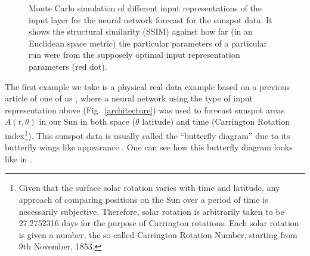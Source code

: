 \documentclass[journal]{IEEEtran}
\begin{document}

\begin{figure}[!htb]
\centering
{}
\caption{Monte Carlo simulation of different  input representations  of the input layer for the neural network forecast for the sunspot data.
It shows the structural similarity (SSIM) against how far (in an Euclidean space metric) the particular parameters of a particular
run were from the supposely optimal  input representation  parameters (red dot).}
\label{MonteCarloSSIMversusParameterMetricDistance}
\end{figure}

The first example we take is a physical real data example based on a previous article of one of us \cite{covaspeixinhojoao}, where a 
neural network using the type of  input representation  above (Fig.\ \ref{architecture}) was used to forecast sunspot areas $A(t,\theta)$ in our 
Sun in both space ($\theta$ latitude) and time (Carrington Rotation index\footnote{Given that the surface solar rotation 
varies with time and latitude,
any approach of comparing positions on the Sun over a period of time is necessarily subjective.
Therefore, solar rotation is arbitrarily taken to be 27.2752316 days
for the purpose of Carrington rotations. Each solar rotation is given a 
number, the so called Carrington Rotation Number, starting from 9th November, 1853.}). This sunspot data is usually called the
``butterfly diagram'' due to its butterfly wings like appearance \cite{1904MNRAS..64..747M}. One can see how this butterfly diagram looks like in
\cite{BibEntry2018Mar}.
\end{document}
